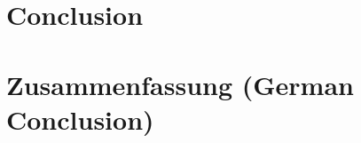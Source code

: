 \documentclass[12pt,a4paper,titlepage,oneside,abstract=true,toc=listof,toc=bibliography]{scrreprt}
\begin{document}
\chapter{Conclusion}

\chapter{Zusammenfassung (German Conclusion)}

 
\cleardoublepage			

%

\cleardoublepage
\end{document}
